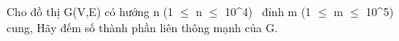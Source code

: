 Cho đồ thị G(V,E) có hướng n (1 $\le$ n $\le$ 10^4)  đỉnh m (1 $\le$ m $\le$ 10^5) cung, Hãy đếm số thành phần liên thông mạnh của G.

\